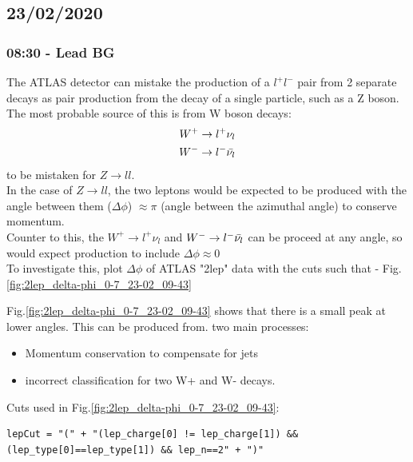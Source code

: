 

\subsection*{\textbf{23/02/2020}}
\subsubsection*{08:30 - Lead BG}
The ATLAS detector can mistake the production of a $l^+ l^-$ pair from 2 separate decays as pair production from the decay of a single particle, such as a Z boson.
\\
The most probable source of this is from W boson decays:
\begin{align*}
    W^+ \rightarrow l^+ \nu_{l}
    \\
    W^- \rightarrow l^- \Bar{\nu_{l}}
\end{align*}
to be mistaken for $Z \rightarrow ll$.
\\
In the case of $Z \rightarrow ll$, the two leptons would be expected to be produced with the angle between them ($\Delta \phi$) $\approx \pi$ (angle between the azimuthal angle) to conserve momentum.
\\
Counter to this, the  $W^+ \rightarrow l^+ \nu_{l}$ and $W^- \rightarrow l^- \Bar{\nu_{l}}$ can be proceed at any angle, so would expect production to include $\Delta \phi \approx 0$
\\
To investigate this, plot $\Delta \phi$ of ATLAS "2lep" data with the cuts such that - Fig.\ref{fig:2lep_delta-phi_0-7_23-02_09-43}

Fig.\ref{fig:2lep_delta-phi_0-7_23-02_09-43} shows that there is a small peak at lower angles.  This can be produced from. two main processes:
\begin{itemize}
    \item Momentum conservation to compensate for jets
    \item incorrect classification for two W+ and W- decays.
\end{itemize}

Cuts used in Fig.\ref{fig:2lep_delta-phi_0-7_23-02_09-43}:
\begin{lstlisting}
lepCut = "(" + "(lep_charge[0] != lep_charge[1]) && (lep_type[0]==lep_type[1]) && lep_n==2" + ")"
\end{lstlisting}

